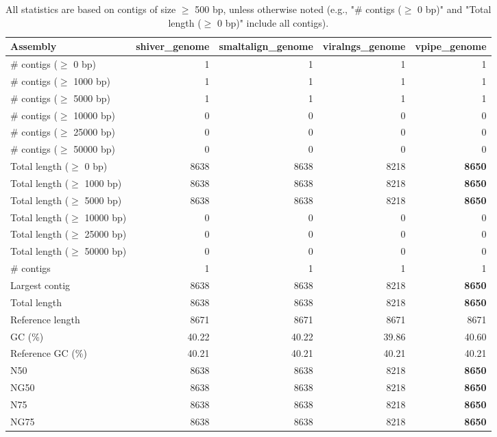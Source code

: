 \documentclass[12pt,a4paper]{article}
\begin{document}
\begin{table}[ht]
\begin{center}
\caption{All statistics are based on contigs of size $\geq$ 500 bp, unless otherwise noted (e.g., "\# contigs ($\geq$ 0 bp)" and "Total length ($\geq$ 0 bp)" include all contigs).}
\begin{tabular}{|l*{4}{|r}|}
\hline
Assembly & shiver\_genome & smaltalign\_genome & viralngs\_genome & vpipe\_genome \\ \hline
\# contigs ($\geq$ 0 bp) & 1 & 1 & 1 & 1 \\ \hline
\# contigs ($\geq$ 1000 bp) & 1 & 1 & 1 & 1 \\ \hline
\# contigs ($\geq$ 5000 bp) & 1 & 1 & 1 & 1 \\ \hline
\# contigs ($\geq$ 10000 bp) & 0 & 0 & 0 & 0 \\ \hline
\# contigs ($\geq$ 25000 bp) & 0 & 0 & 0 & 0 \\ \hline
\# contigs ($\geq$ 50000 bp) & 0 & 0 & 0 & 0 \\ \hline
Total length ($\geq$ 0 bp) & 8638 & 8638 & 8218 & {\bf 8650} \\ \hline
Total length ($\geq$ 1000 bp) & 8638 & 8638 & 8218 & {\bf 8650} \\ \hline
Total length ($\geq$ 5000 bp) & 8638 & 8638 & 8218 & {\bf 8650} \\ \hline
Total length ($\geq$ 10000 bp) & 0 & 0 & 0 & 0 \\ \hline
Total length ($\geq$ 25000 bp) & 0 & 0 & 0 & 0 \\ \hline
Total length ($\geq$ 50000 bp) & 0 & 0 & 0 & 0 \\ \hline
\# contigs & 1 & 1 & 1 & 1 \\ \hline
Largest contig & 8638 & 8638 & 8218 & {\bf 8650} \\ \hline
Total length & 8638 & 8638 & 8218 & {\bf 8650} \\ \hline
Reference length & 8671 & 8671 & 8671 & 8671 \\ \hline
GC (\%) & 40.22 & 40.22 & 39.86 & 40.60 \\ \hline
Reference GC (\%) & 40.21 & 40.21 & 40.21 & 40.21 \\ \hline
N50 & 8638 & 8638 & 8218 & {\bf 8650} \\ \hline
NG50 & 8638 & 8638 & 8218 & {\bf 8650} \\ \hline
N75 & 8638 & 8638 & 8218 & {\bf 8650} \\ \hline
NG75 & 8638 & 8638 & 8218 & {\bf 8650} \\ \hline

\end{tabular}
\end{center}
\end{table}
\end{document}
